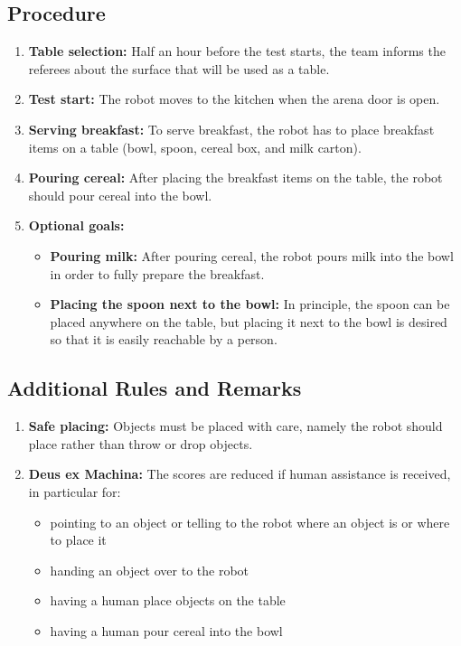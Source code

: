 \subsection*{Procedure}
\begin{enumerate}[nosep]
	\item \textbf{Table selection:} Half an hour before the test starts, the team informs the referees about the surface that will be used as a table.
	\item \textbf{Test start:} The robot moves to the kitchen when the arena door is open.
	\item \textbf{Serving breakfast:} To serve breakfast, the robot has to place breakfast items on a table (bowl, spoon, cereal box, and milk carton).
	\item \textbf{Pouring cereal:} After placing the breakfast items on the table, the robot should pour cereal into the bowl.
	\item \textbf{Optional goals:}
		\begin{itemize}
			\item \textbf{Pouring milk:} After pouring cereal, the robot pours milk into the bowl in order to fully prepare the breakfast.
			\item \textbf{Placing the spoon next to the bowl:} In principle, the spoon can be placed anywhere on the table, but placing it next to the bowl is desired so that it is easily reachable by a person.
		\end{itemize}
\end{enumerate}

\subsection*{Additional Rules and Remarks}
\begin{enumerate}[nosep]
	\item \textbf{Safe placing:} Objects must be placed with care, namely the robot should place rather than throw or drop objects.
	\item \textbf{Deus ex Machina:} The scores are reduced if human assistance is received, in particular for:
	\begin{itemize}[nosep]
		\item pointing to an object or telling to the robot where an object is or where to place it
		\item handing an object over to the robot
		\item having a human place objects on the table
		\item having a human pour cereal into the bowl
	\end{itemize}
\end{enumerate}


